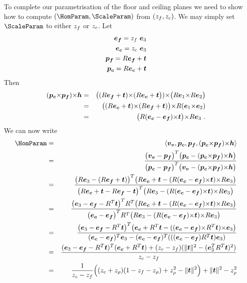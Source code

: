 
To complete our parametrisation of the floor and ceiling planes we
need to show how to compute $(\HomParam,\ScaleParam)$ from
$(\zfloor,\zceil)$. We may simply set $\ScaleParam$ to either
$\zfloor$ or $\zceil$. Let
\begin{eqnarray}
  \efloor = \zfloor ~ \ez \\
  \eceil = \zceil ~ \ez \\
  \pfloor = \RetProj{\efloor} \\
  \pceil = \RetProj{\eceil}
\end{eqnarray}
Then
\begin{eqnarray}
  (\pceil \cross \pfloor) \cross \horizon &=&
    \bigl((\RetProj{\efloor}) \cross (\RetProj{\eceil}\bigr))
    \cross
    \bigl(\CamR\ex \cross
          \CamR\ey \bigr)\\
  &=& \bigl( (\RetProj{\eceil}) \cross (\RetProj{\efloor}) \bigr)
      \cross
      \CamR(\ex\cross\ey) \\
  &=& \bigl( \CamR(\eceil-\efloor)\cross\CamTr \bigr)
      \cross
      \CamR\ez ~.
\end{eqnarray}
We can now write
\begin{eqnarray}
  \HomParam &=& 
    \langle\vvpt,\pceil,\pfloor,(\pceil\cross\pfloor)\cross\horizon\rangle \\
  &=& \frac{
    \bigl(\vvpt-\pfloor\bigr)^T
    \bigl(\pceil-(\pceil\cross\pfloor)\cross\horizon\bigr)
   }{
    \bigl(\pceil-\pfloor\bigr)^T
    \bigl(\vvpt-(\pceil\cross\pfloor)\cross\horizon\bigr)
   }\\
  &=& \frac{
    \bigl(\CamR\ez - (\CamR\efloor+\CamTr)\bigr)^T
    \bigl(\CamR\eceil+\CamTr-
          (\CamR(\eceil-\efloor)\cross\CamTr)\cross\CamR\ez
          \bigr)
   }{
    \bigl(\CamR\eceil+\CamTr-\CamR\efloor-\CamTr\bigr)^T
    \bigl(\CamR\ez-
          (\CamR(\eceil-\efloor)\cross\CamTr)\cross\CamR\ez
          \bigr)
   }\\
  &=& \frac{
    \bigl(\ez - \efloor - \CamR^T\CamTr\bigr)^T R^T
    \bigl(\CamR\eceil+\CamTr-
          (\CamR(\eceil-\efloor)\cross\CamTr)\cross\CamR\ez
          \bigr)
   }{
    \bigl(\eceil-\efloor\bigr)^T R^T
    \bigl(\CamR\ez-
          (\CamR(\eceil-\efloor)\cross\CamTr)\cross\CamR\ez
          \bigr)
   }\\
  &=& \frac{
    \bigl(\ez - \efloor - \CamR^T\CamTr\bigr)^T
    \bigl(\eceil + \CamR^T\CamTr -
          ((\eceil-\efloor)\cross\CamR^T\CamTr)\cross\ez
          \bigr)
   }{
    (\eceil-\efloor)^T\ez -
    (\eceil-\efloor)^T(((\eceil-\efloor)\CamR^T\CamTr)\ez)
   }\\
  &=& \frac{
    (\ez-\efloor-\CamR^T\CamTr)^T(\eceil+\CamR^T\CamTr)
    +(\zceil-\zfloor)(\|\CamTr\|^2 - (\ez^T\CamR^T\CamTr)^2)
   }{
    \zceil-\zfloor
   }\\
  &=& \frac{1}{\zceil-\zfloor}
    \Bigl( (\zceil + \zcam)(1-\zfloor-\zcam) + \zcam^2 - \|\CamTr\|^2 \Bigr)
     + \|\CamTr\|^2 - \zcam^2
\end{eqnarray}
